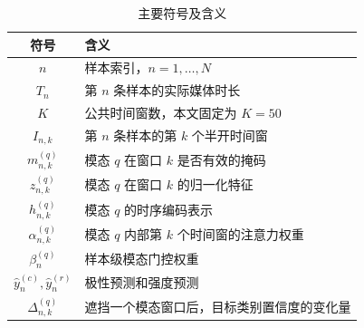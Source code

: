 \documentclass{gmcmthesis}
\begin{document}
\begin{table}[H]
\centering
\caption{主要符号及含义}
\label{tab:symbols}
\begin{tabularx}{0.98\textwidth}{cY}
\toprule
符号 & 含义 \\
\midrule
$n$ & 样本索引，$n=1,\ldots,N$ \\
$T_n$ & 第 $n$ 条样本的实际媒体时长 \\
$K$ & 公共时间窗数，本文固定为 $K=50$ \\
$I_{n,k}$ & 第 $n$ 条样本的第 $k$ 个半开时间窗 \\
$m_{n,k}^{(q)}$ & 模态 $q$ 在窗口 $k$ 是否有效的掩码 \\
$z_{n,k}^{(q)}$ & 模态 $q$ 在窗口 $k$ 的归一化特征 \\
$h_{n,k}^{(q)}$ & 模态 $q$ 的时序编码表示 \\
$\alpha_{n,k}^{(q)}$ & 模态 $q$ 内部第 $k$ 个时间窗的注意力权重 \\
$\beta_n^{(q)}$ & 样本级模态门控权重 \\
$\hat y_n^{(c)},\hat y_n^{(r)}$ & 极性预测和强度预测 \\
$\Delta_{n,k}^{(q)}$ & 遮挡一个模态窗口后，目标类别置信度的变化量 \\
\bottomrule
\end{tabularx}
\end{table}
\end{document}
